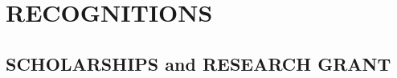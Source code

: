 \documentclass[11pt,letterpaper,sans]{moderncv}        %
\begin{document}


\vspace{0.2cm}
\section{RECOGNITIONS}

\subsection{SCHOLARSHIPS and RESEARCH GRANT}
\end{document}
